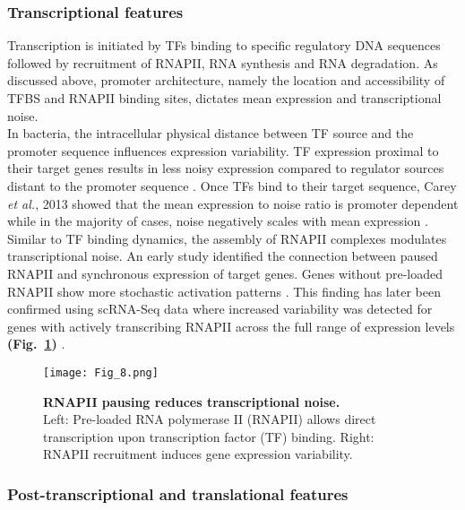 \subsubsection{Transcriptional features}

Transcription is initiated by TFs binding to specific regulatory DNA sequences followed by recruitment of RNAPII, RNA synthesis and RNA degradation. As discussed above, promoter architecture, namely the location and accessibility of TFBS and RNAPII binding sites, dictates mean expression and transcriptional noise. \\

In bacteria, the intracellular physical distance between TF source and the promoter sequence influences expression variability. TF expression proximal to their target genes results in less noisy expression compared to regulator sources distant to the promoter sequence \citep{Goni-Moreno2017}. Once TFs bind to their target sequence, Carey \emph{et al.}, 2013 showed that the mean expression to noise ratio is promoter dependent while in the majority of cases, noise negatively scales with mean expression \citep{Carey2013}. \\

Similar to TF binding dynamics, the assembly of RNAPII complexes modulates transcriptional noise. An early study identified the connection between paused RNAPII and synchronous expression of target genes. Genes without pre-loaded RNAPII show more stochastic activation patterns \citep{Boettiger2009}. This finding has later been confirmed using scRNA-Seq data where increased variability was detected for genes with actively transcribing RNAPII across the full range of expression levels \textbf{(Fig.~\ref{fig0:RNAPII})} \citep{Day2016}.\\

\begin{figure}[!h]
\centering
\texttt{[image: Fig\_8.png]}
\caption[RNAPII pausing reduces transcriptional noise]{\textbf{RNAPII pausing reduces transcriptional noise.}\\
Left: Pre-loaded RNA polymerase II (RNAPII) allows direct transcription upon transcription factor (TF) binding. Right: RNAPII recruitment induces gene expression variability.}
\label{fig0:RNAPII}
\end{figure} 

\newpage

\subsubsection{Post-transcriptional and translational features}

